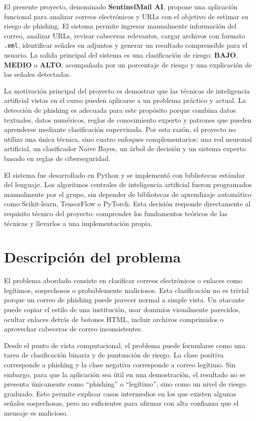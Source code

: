\documentclass[12pt,letterpaper]{article}
\begin{document}
El presente proyecto, denominado \textbf{SentinelMail AI}, propone una aplicación funcional para analizar correos electrónicos y URLs con el objetivo de estimar su riesgo de phishing. El sistema permite ingresar manualmente información del correo, analizar URLs, revisar cabeceras relevantes, cargar archivos con formato \texttt{.eml}, identificar señales en adjuntos y generar un resultado comprensible para el usuario. La salida principal del sistema es una clasificación de riesgo: \textbf{BAJO}, \textbf{MEDIO} o \textbf{ALTO}, acompañada por un porcentaje de riesgo y una explicación de las señales detectadas.

La motivación principal del proyecto es demostrar que las técnicas de inteligencia artificial vistas en el curso pueden aplicarse a un problema práctico y actual. La detección de phishing es adecuada para este propósito porque combina datos textuales, datos numéricos, reglas de conocimiento experto y patrones que pueden aprenderse mediante clasificación supervisada. Por esta razón, el proyecto no utiliza una única técnica, sino cuatro enfoques complementarios: una red neuronal artificial, un clasificador Naive Bayes, un árbol de decisión y un sistema experto basado en reglas de ciberseguridad.

El sistema fue desarrollado en Python y se implementó con bibliotecas estándar del lenguaje. Los algoritmos centrales de inteligencia artificial fueron programados manualmente por el grupo, sin depender de bibliotecas de aprendizaje automático como Scikit-learn, TensorFlow o PyTorch. Esta decisión responde directamente al requisito técnico del proyecto: comprender los fundamentos teóricos de las técnicas y llevarlos a una implementación propia.

\section{Descripción del problema}

El problema abordado consiste en clasificar correos electrónicos o enlaces como legítimos, sospechosos o probablemente maliciosos. Esta clasificación no es trivial porque un correo de phishing puede parecer normal a simple vista. Un atacante puede copiar el estilo de una institución, usar dominios visualmente parecidos, ocultar enlaces detrás de botones HTML, incluir archivos comprimidos o aprovechar cabeceras de correo inconsistentes.

Desde el punto de vista computacional, el problema puede formularse como una tarea de clasificación binaria y de puntuación de riesgo. La clase positiva corresponde a phishing y la clase negativa corresponde a correo legítimo. Sin embargo, para que la aplicación sea útil en una demostración, el resultado no se presenta únicamente como ``phishing'' o ``legítimo'', sino como un nivel de riesgo graduado. Esto permite explicar casos intermedios en los que existen algunas señales sospechosas, pero no suficientes para afirmar con alta confianza que el mensaje es malicioso.
\end{document}
